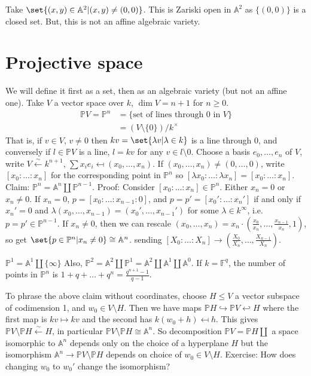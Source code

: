 \documentclass{article}
\newcommand{\A}{\mathbb{A}}
\newcommand{\F}{\mathbb{F}}
\begin{document}
\begin{warning}
    Take $\set{(x, y) \in \A^2 | (x, y) \neq (0, 0)}$. This is Zariski open in $\A^2$ as $\{(0, 0)\}$ is a closed set. But, this is not an affine algebraic variety.
\end{warning}

\clearpage
\section{Projective space}
We will define it first as a set, then as an algebraic variety (but not an affine one).
Take $V$ a vector space over $k$, $\dim V = n+1$ for $n \geq 0$.
\begin{align*}
    \mathbb{P}V = \mathbb{P}^n &= \{\text{set of lines through } 0 \text{ in } V\} \\
                               &= (V \setminus \{0\}) /k^\times
\end{align*}
That is, if $v \in V$, $v \neq 0$ then $k v = \set{\lambda v | \lambda \in k}$ is a line through $0$, and conversely if $l \in \mathbb{P}V$ is a line, $l = kv$ for any $v \in l \setminus 0$.
Choose a basis $e_0, \dotsc, e_n$ of $V$, write $V \overset{\sim}{\leftarrow} k^{n+1}$, $\sum x_i e_i \mapsfrom (x_0, \dotsc, x_n)$. If $(x_0, \dotsc, x_n) \neq (0, \dotsc, 0)$, write $[x_0: \dotsc: x_n]$ for the corresponding point in $\mathbb{P}^n$ so $[\lambda x_0: \dotsc: \lambda x_n] = [x_0: \dotsc : x_n]$.
Claim: $\mathbb{P}^n = \A^n \amalg \mathbb{P}^{n-1}$.
Proof: Consider $[x_0 : \dotsc : x_n] \in \mathbb{P}^n$. Either $x_n = 0$ or $x_n \neq 0$.
If $x_n = 0$, $p = [x_0 : \dotsc : x_{n-1} : 0]$, and $p = p' = [x_0' : \dotsc : x_n']$ if and only if $x_n' =0$ and $\lambda(x_0, \dotsc, x_{n-1}) = (x_0', \dotsc, x_{n-1}')$ for some $\lambda \in k^\infty$, i.e. $p = p' \in \mathbb{P}^{n-1}$.
If $x_n \neq 0$, then we can rescale $(x_0, \dotsc, x_n) = x_n \cdot (\frac{x_0}{x_n}, \dotsc, \frac{x_{n-1}}{x_n}, 1)$, so get $\set{p \in \mathbb{P}^n | x_n \neq 0} \cong \A^n$. sending $[X_0 : \dotsc : X_n] \to (\frac{X_0}{X_n}, \dotsc, \frac{X_{n-1}}{X_n})$.
\begin{eg}
    $\mathbb{P}^1 = \A^1 \amalg \{\infty\}$ %
    Also, $\mathbb{P}^2 = \A^2 \amalg \mathbb{P}^1 = \A^2 \amalg \A^1 \amalg \A^0$.
    If $k = \F^q$, the number of points in $\mathbb{P}^n$ is $1 + q + \dotsc + q^n = \frac{q^{n+1}-1}{q-1}$.
\end{eg}
To phrase the above claim without coordinates, choose $H \leq V$ a vector subspace of codimension 1, and $w_0 \in V \setminus H$.
Then we have maps $\mathbb{P}H \hookrightarrow \mathbb{P} V \hookleftarrow H$ where the first map is $kv \mapsto kv$ and the second has $k(w_0 + h) \mapsfrom h$.
This gives $\mathbb{P}V \setminus \mathbb{P}H \overset{\sim}{\leftarrow} H$, in particular $\mathbb{P}V \setminus \mathbb{P}H \cong \A^n$.
So decomposition $\mathbb{P}V = \mathbb{P}H \amalg$ a space isomorphic to $\A^n$ depends only on the choice of a hyperplane $H$ but the isomorphism $\A^n \to \mathbb{P}V \setminus \mathbb{P}H$ depends on choice of $w_0 \in V \setminus H$.
Exercise: How does changing $w_0$ to $w_0'$ change the isomorphism?
\end{document}
